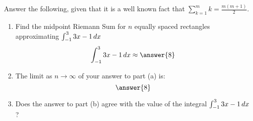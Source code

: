 \documentclass{ximera}
\author{Gregory Hartman \and Matthew Carr}
\begin{document}
\begin{exercise}



Answer the following, given that it is a well known fact that $\sum_{k=1}^{m}k=\frac{m(m+1)}{2}$.
\begin{enumerate}
\item		Find the midpoint Riemann Sum for $n$ equally spaced rectangles approximating $\int_{-1}^{3}3x-1\,d x$ \[\int_{-1}^{3}3x-1\d x\approx\answer{8}\]
\item		The limit as $n\to\infty$ of your answer to part (a) is: \[\answer{8}\]
\item		Does the answer to part (b) agree with the value of the integral $\int_{-1}^{3}3x-1\,d x$? \begin{multipleChoice}
\end{multipleChoice}
\end{enumerate}
\end{exercise}
\end{document}
